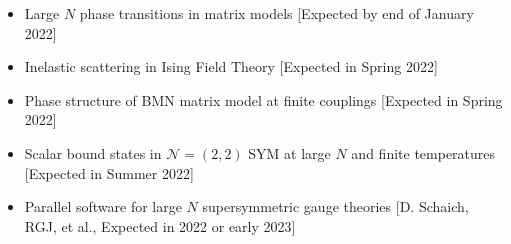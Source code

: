 \renewcommand{\arraystretch}{1.1}

	\begin{itemize} 
	\item Large $N$ phase transitions in matrix models [Expected by end of January 2022] 
	 \item Inelastic scattering in Ising Field Theory [Expected in Spring 2022] 
	 \item Phase structure of BMN matrix model at finite couplings [Expected in Spring 2022] 
	 \item Scalar bound states in $\mathcal{N}=(2,2)$ SYM at large $N$ and finite temperatures [Expected in Summer 2022] 
	 \item Parallel software for large $N$ supersymmetric gauge theories [D. Schaich, RGJ, et al., Expected in 2022 or early 2023] 
	 \end{itemize}
